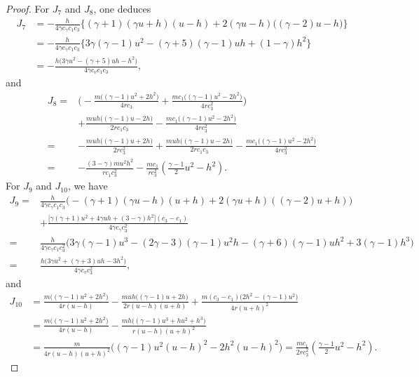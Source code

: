 \documentclass[10pt,a4paper]{amsart}
\begin{document}
\begin{proof}
For $J_7$ and $J_8$, one deduces
\begin{align*}
J_7
&= -\frac{h}{4\gamma c_\gamma c_1 c_3} \bigg\{
      (\gamma+1)(\gamma u+h)(u-h)
      + 2(\gamma u-h)\big((\gamma-2)u-h\big)
    \bigg\} \\
&= -\frac{h}{4\gamma c_\gamma c_1 c_3} \bigg\{
      3\gamma(\gamma-1)u^2 - (\gamma+5)(\gamma-1)u h + (1-\gamma)h^2
    \bigg\} \\
&= -\frac{h\big(3\gamma u^2 - (\gamma+5)u h - h^2\big)}{4\gamma c_v c_1 c_3},
\end{align*}
and
\begin{align*}
J_8
=&\bigg(-\frac{m\big((\gamma-1)u^2+2h^2\big)}{4r c_3}
+ \frac{m c_1\big((\gamma-1)u^{2}-2h^{2}\big)}{4r c_3^2}\bigg) \\
&+  \frac{muh\big((\gamma-1)u-2h\big)}{2r c_1 c_3}- \frac{m c_1\big((\gamma-1)u^{2}-2h^{2}\big)}{4r c_3^2}  \\
=& -\frac{m u h \big( (\gamma-1) u + 2h \big)}{2r c_3^2} + \frac{muh\big((\gamma-1)u-2h\big)}{2r c_1 c_3}
- \frac{m c_1\big((\gamma-1)u^{2}-2h^{2}\big)}{4r c_3^2}  \\
=& -\frac{(3-\gamma) m u^2 h^2}{r c_1 c_3^2}- \frac{m c_1}{r c_3^2}\left( \frac{\gamma-1}{2}u^{2} - h^{2} \right).
\end{align*}
For $J_9$ and $J_{10}$, we have
\begin{align*}
J_9
=& \frac{h}{4\gamma c_\gamma c_1 c_3}\Big(-(\gamma+1)(\gamma u-h)(u+h) + 2(\gamma u+h)((\gamma-2)u+h)\Big)\\
  & + \frac{\big[\gamma(\gamma+1)u^2+4\gamma uh+(3-\gamma)h^2\big](c_3-c_1)}{4\gamma c_\gamma c_3^2} \\
=& \frac{h}{4\gamma c_\gamma c_1 c_3^2}\Big( 3\gamma(\gamma-1) u^3-(2\gamma-3)(\gamma-1)u^2 h-(\gamma+6)(\gamma-1)u h^2+3(\gamma-1)h^3 \Big) \\
=& \frac{h\big(3\gamma u^2+(\gamma+3)u h-3h^2\big)}{4\gamma c_v c_3^2 },
\end{align*}
and
\begin{align*}
J_{10}
&= \frac{m\big((\gamma-1)u^{2}+2h^{2}\big)}{4r (u-h)}
   - \frac{m u h\big((\gamma-1)u+2h\big)}{2r (u-h)(u+h)}
   + \frac{m (c_3-c_1) \big(2h^{2}-(\gamma-1)u^{2}\big)}{4r (u+h)^2} \\
&=\frac{m\big((\gamma-1)u^{2}+2h^{2}\big)}{4r (u-h)} -\frac{m h\big(  (\gamma-1)u^3 + hu^2 + h^3 \big)}{r (u-h)(u+h)^2}\\
&= \frac{m}{4r(u-h) (u+h)^2} \Big(
      (\gamma-1)u^{2}(u-h)^2 - 2h^{2}(u-h)^2 \Big)
= \frac{mc_1}{2r c_3^2} \left( \frac{\gamma-1}{2}u^{2} - h^{2} \right).

\end{align*}
\end{proof}
\end{document}

